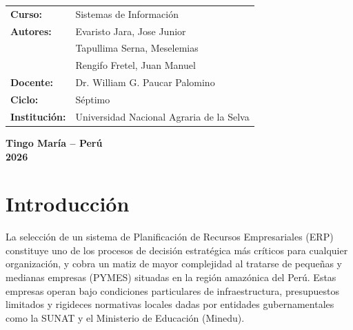 \documentclass[12pt,a4paper,oneside]{report}
\begin{document}
\begin{titlepage}
\begin{center}
        \begin{minipage}{0.85\textwidth}
            \begin{flushleft}
                \begin{tabular}{@{}p{3.5cm}p{9.5cm}@{}}
                    \textbf{Curso:} & Sistemas de Información \\[0.2cm]
                    \textbf{Autores:} & Evaristo Jara, Jose Junior \\
                                      & Tapullima Serna, Meselemias \\
                                      & Rengifo Fretel, Juan Manuel \\[0.2cm]
                    \textbf{Docente:} & Dr. William G. Paucar Palomino \\[0.2cm]
                    \textbf{Ciclo:} & Séptimo \\[0.2cm]
                    \textbf{Institución:} & Universidad Nacional Agraria de la Selva \\[0.2cm]
                \end{tabular}
            \end{flushleft}
        \end{minipage}
        
        \vfill
        
        {\fontsize{12}{14}\selectfont\textbf{Tingo María -- Perú}} \\[0.2cm]
        {\fontsize{12}{14}\selectfont\textbf{2026}}
    \end{center}
\end{titlepage}

\setcounter{page}{1}

\chapter*{Introducción}

La selección de un sistema de Planificación de Recursos Empresariales (ERP) constituye uno de los procesos de decisión estratégica más críticos para cualquier organización, y cobra un matiz de mayor complejidad al tratarse de pequeñas y medianas empresas (PYMES) situadas en la región amazónica del Perú. Estas empresas operan bajo condiciones particulares de infraestructura, presupuestos limitados y rigideces normativas locales dadas por entidades gubernamentales como la SUNAT y el Ministerio de Educación (Minedu).
\end{document}
